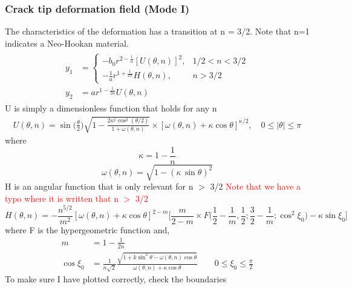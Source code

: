 \documentclass[12pt,3p]{article}
\numberwithin{equation}{section}
\begin{document}
\subsubsection{Crack tip deformation field (Mode I)}
The characteristics of the deformation has a transition at n = 3/2. Note that n=1 indicates a Neo-Hookan material. 
\begin{align}\label{EqDisp}
\begin{split}
y_{1} &= \left\{\begin{array}{ll}
-b_{0} r^{2-\frac{1}{n}}[U(\theta, n)]^{2}, & 1 / 2<n<3 / 2 \\
-\frac{1}{a} r^{1+\frac{1}{2 \pi}} H(\theta, n), & n>3 / 2
\end{array}\right. \\
y_2 &= a r^{1 - \frac{1}{2n}} U (\theta, n) 
\end{split}
\end{align}
U is simply a dimensionless function that holds for any n 
\begin{align}\label{EqU}
U (\theta, n) = \sin \bigg( \frac{\theta}{2} \bigg) \sqrt{1-\frac{2 \kappa^{2} \cos ^{2}(\theta / 2)}{1+\omega(\theta, n)}} \times[\omega(\theta, n)+\kappa \cos \theta]^{\kappa / 2}, \quad 0 \leq|\theta| \leq \pi
\end{align}
where 
\begin{equation}\label{EqKappa}
\kappa = 1 - \frac{1}{n}
\end{equation}
\begin{equation}\label{EqOmega}
\omega (\theta, n) = \sqrt{1 - (\kappa \, \sin \theta)^2}
\end{equation}
H is an angular function that is only relevant for n $>$ 3/2 \textcolor{red}{Note that we have a typo where it is written that n $>$ 3/2}
\begin{equation}
H(\theta, n) = -\frac{n^{5 / 2}}{m^{2}}[\omega(\theta, n)+ \kappa \cos \theta]^{2-m} \bigg[ \frac{m}{2-m} \times F \bigg(\frac{1}{2}-\frac{1}{m}, \frac{1}{2} ; \frac{3}{2}-\frac{1}{m} ; \cos ^{2} \xi_{0} \bigg) -\kappa \sin \xi_{0} \bigg]
\end{equation}
where F is the hypergeometric function and, 
\begin{align*}
m &= 1 - \frac{1}{2n} \\
\cos \xi_{0} &= \frac{1}{n \sqrt{2}} \frac{\sqrt{1+k \sin ^{2} \theta-\omega(\theta, n) \cos \theta}}{\omega(\theta, n)+\kappa \cos \theta} 
\quad \quad 0 \leq \xi_{0} \leq \frac{\pi}{2}
\end{align*}
To make sure I have plotted correctly, check the boundaries 
\end{document}
